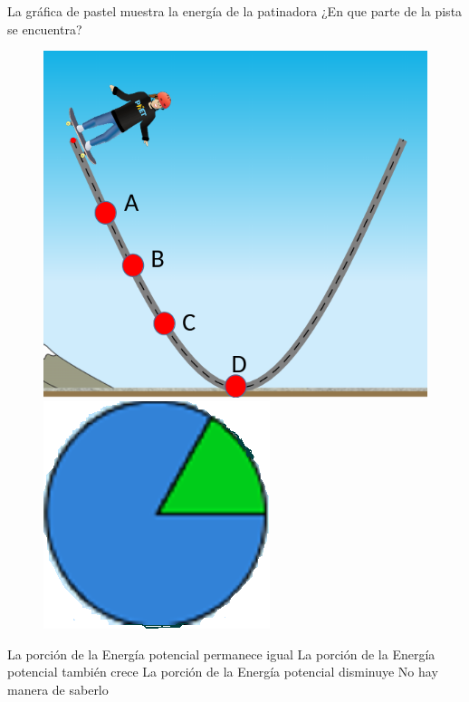 La gráfica de pastel muestra la energía de la patinadora ¿En que parte de la pista se encuentra?

\begin{minipage}{0.3\textwidth}
    \begin{figure}[H]
        \includegraphics[width=.72\linewidth]{../images/q028f}
        \includegraphics[width=.25\linewidth]{../images/q028g}
    \end{figure}
\end{minipage}\hfill
\begin{minipage}{0.6\textwidth}
    \begin{choices}
        \choice La porción de la Energía potencial permanece igual
        \choice La porción de la Energía potencial también crece
        \choice La porción de la Energía potencial disminuye
        \choice No hay manera de saberlo
    \end{choices}
\end{minipage}
